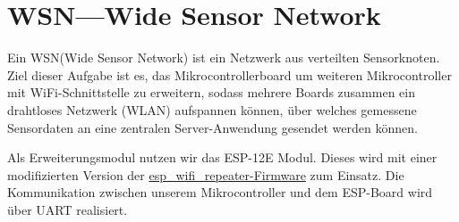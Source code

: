 \clearpage
\section{\ExercisePrefixEmbeddedC WSN---Wide Sensor Network\optional}
\newcommand{\toolWSN}{\textsc{WSN}\xspace}

Ein \toolWSN (Wide Sensor Network) ist ein Netzwerk aus verteilten Sensorknoten. Ziel dieser Aufgabe ist es, das Mikrocontrollerboard um weiteren Mikrocontroller mit WiFi-Schnittstelle zu erweitern, sodass mehrere Boards zusammen ein drahtloses Netzwerk (WLAN) aufspannen können, über welches gemessene Sensordaten an eine zentralen Server-Anwendung gesendet werden können.

Als Erweiterungsmodul nutzen wir das ESP-12E Modul. Dieses wird mit einer modifizierten Version der \href{https://github.com/martin-ger/esp_wifi_repeater}{esp\_wifi\_repeater-Firmware} zum Einsatz. Die Kommunikation zwischen unserem Mikrocontroller und dem ESP-Board wird über UART realisiert.

